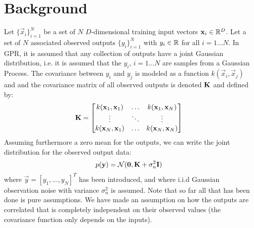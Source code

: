 \documentclass[]{article}
\begin{document}
\section{Background}
\label{sec:bkg}
Let $\{\vec x_i\}_{i=1}^N$ be a set of $N$ $D$-dimensional training input vectors $\boldsymbol{\mathbf{x}}_i \in \mathbb{R}^D$. Let a set of $N$ associated observed outputs $\{y_i\}_{i=1}^N$ with $y_i \in \mathbb{R}$ for all $i=1\hdots N$. In GPR, it is assumed that any collection of outputs have a joint Gaussian distribution, i.e. it is assumed that the $y_i$, $i=1\hdots N$ are samples from a Gaussian Process. The covariance between $y_i$ and $y_j$ is modeled as a function $k(\vec x_i, \vec x_j)$ and and the covariance matrix of all observed outputs is denoted $\boldsymbol{\mathbf{{K}}}$ and defined by:
\begin{equation}
  \label{eq:covariancetrainingdata}
  \boldsymbol{\mathbf{{K}}} =
  \begin{bmatrix}
    k(\boldsymbol{\mathbf{x}}_1, \boldsymbol{\mathbf{x}}_1) & \hdots & k(\boldsymbol{\mathbf{x}}_1, \boldsymbol{\mathbf{x}}_N) \\ 
    \vdots & \ddots & \vdots \\ 
    k(\boldsymbol{\mathbf{x}}_N, \boldsymbol{\mathbf{x}}_1) & \hdots & k(\boldsymbol{\mathbf{x}}_N, \boldsymbol{\mathbf{x}}_N) \\ 
  \end{bmatrix}
\end{equation}
Assuming furthermore a zero mean for the outputs, we can write the joint distribution for the observed output data:
\begin{equation}
  \label{eq:probdist}
  p(\boldsymbol{\mathbf{y}}) = \mathcal{N}(\boldsymbol{\mathbf{0}}, \boldsymbol{\mathbf{{K}}} + \sigma_n^2 \boldsymbol{\mathbf{{I}}})
\end{equation}
where $\vec y = [y_1,\hdots, y_N]^T$ has been introduced, and where i.i.d Gaussian observation noise with variance $\sigma_n^2$ is assumed. Note that so far all that has been done is pure assumptions. We have made an assumption on how the outputs are correlated that is completely independent on their observed values (the covariance function only depends on the inputs). 
\end{document}
